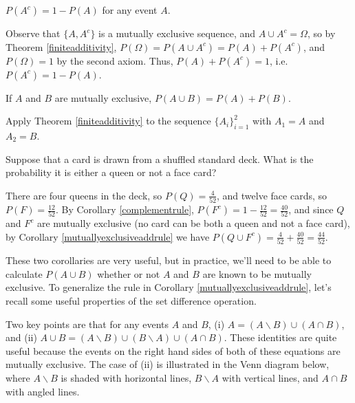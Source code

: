 \par
\begin{cor}\label{complementrule}$P(A^c) = 1 - P(A)$ for any event $A$.
\end{cor}
\begin{pf}
Observe that $\{A, A^c\}$ is a mutually exclusive sequence, and $A \cup A^c = \Omega$, so by Theorem \ref{finiteadditivity}, $P(\Omega) = P(A \cup A^c) = P(A) + P(A^c)$, and $P(\Omega)=1$ by the second axiom. Thus, $P(A)+P(A^c)=1$, i.e. $P(A^c) = 1 - P(A)$. 
\end{pf}
\par
\begin{cor}\label{mutuallyexclusiveaddrule}If $A$ and $B$ are mutually exclusive, $P(A \cup B) = P(A) + P(B)$.
\end{cor}
\begin{pf}
Apply Theorem \ref{finiteadditivity} to the sequence $\{A_i\}_{i=1}^2$ with $A_1 = A$ and $A_2 = B$.
\end{pf}
\par
\begin{examp} Suppose that a card is drawn from a shuffled standard deck. What is the probability it is either a queen or not a face card?
\par
\noindent There are four queens in the deck, so $P(Q) = \frac{4}{52}$, and twelve face cards, so $P(F) = \frac{12}{52}$. By Corollary \ref{complementrule}, $P(F^c) = 1 - \frac{12}{52} = \frac{40}{52}$, and since $Q$ and $F^c$ are mutually exclusive (no card can be both a queen and not a face card), by Corollary \ref{mutuallyexclusiveaddrule} we have $P(Q \cup F^c) = \frac{4}{52} + \frac{40}{52} = \frac{44}{52}$.
\end{examp}
\par
These two corollaries are very useful, but in practice, we'll need to be able to calculate $P(A \cup B)$ whether or not $A$ and $B$ are known to be mutually exclusive. To generalize the rule in Corollary \ref{mutuallyexclusiveaddrule}, let's recall some useful properties of the set difference operation.
\par
Two key points are that for any events $A$ and $B$, (i) $A = (A\backslash B) \cup (A \cap B)$, and (ii) $A \cup B = (A\backslash B) \cup (B\backslash A) \cup (A \cap B)$. These identities are quite useful because the events on the right hand sides of both of these equations are  mutually exclusive. The case of (ii) is illustrated in the Venn diagram below, where $A\backslash B$ is shaded with horizontal lines, $B \backslash A$ with vertical lines, and $A \cap B$ with angled lines.

